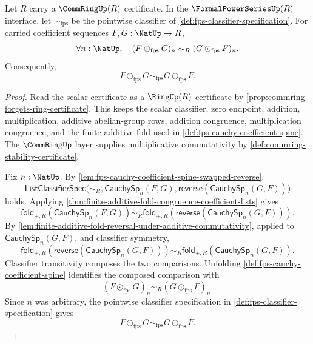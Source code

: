 \begin{theorem}
\label{thm:fps-cauchy-product-commutativity-from-commring-scalars}
Let $R$ carry a $\CommRingUp(R)$ certificate. In the $\FormalPowerSeriesUp(R)$ interface, let $\sim_{\mathrm{fps}}$ be the pointwise classifier of \autoref{def:fps-classifier-specification}. For carried coefficient sequences $F,G:\NatUp\to R$,
$$
\forall n:\NatUp,\quad
(F\odot_{\mathrm{fps}}G)_n\sim_R(G\odot_{\mathrm{fps}}F)_n.
$$
Consequently,
$$
F\odot_{\mathrm{fps}}G\sim_{\mathrm{fps}}G\odot_{\mathrm{fps}}F.
$$
\end{theorem}
\begin{proof}
Read the scalar certificate as a $\RingUp(R)$ certificate by \autoref{prop:commring-forgets-ring-certificate}. This keeps the scalar classifier, zero endpoint, addition, multiplication, additive abelian-group rows, addition congruence, multiplication congruence, and the finite additive fold used in \autoref{def:fps-cauchy-coefficient-spine}. The $\CommRingUp$ layer supplies multiplicative commutativity by \autoref{def:commring-stability-certificate}.

Fix $n:\NatUp$. By \autoref{lem:fps-cauchy-coefficient-spine-swapped-reverse},
$$
\mathsf{ListClassifierSpec}\bigl(\sim_R,
\mathsf{CauchySp}_n(F,G),
\mathsf{reverse}(\mathsf{CauchySp}_n(G,F))\bigr)
$$
holds. Applying \autoref{thm:finite-additive-fold-congruence-coefficient-lists} gives
$$
\mathsf{fold}_{+,R}(\mathsf{CauchySp}_n(F,G))
\sim_R
\mathsf{fold}_{+,R}(\mathsf{reverse}(\mathsf{CauchySp}_n(G,F))).
$$
By \autoref{lem:finite-additive-fold-reversal-under-additive-commutativity}, applied to $\mathsf{CauchySp}_n(G,F)$, and classifier symmetry,
$$
\mathsf{fold}_{+,R}(\mathsf{reverse}(\mathsf{CauchySp}_n(G,F)))
\sim_R
\mathsf{fold}_{+,R}(\mathsf{CauchySp}_n(G,F)).
$$
Classifier transitivity composes the two comparisons. Unfolding \autoref{def:fps-cauchy-coefficient-spine} identifies the composed comparison with
$$
(F\odot_{\mathrm{fps}}G)_n\sim_R(G\odot_{\mathrm{fps}}F)_n.
$$
Since $n$ was arbitrary, the pointwise classifier specification in \autoref{def:fps-classifier-specification} gives
$$
F\odot_{\mathrm{fps}}G\sim_{\mathrm{fps}}G\odot_{\mathrm{fps}}F.
$$
\end{proof}

